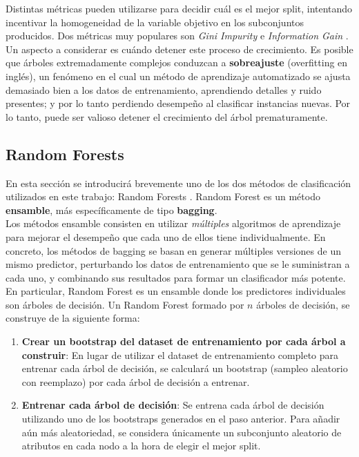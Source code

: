 Distintas métricas pueden utilizarse para decidir cuál es el mejor split, intentando incentivar la homogeneidad de la variable objetivo en los subconjuntos producidos. Dos métricas muy populares son \textit{Gini Impurity} e \textit{Information Gain} \cite{ginigain}.\\

Un aspecto a considerar es cuándo detener este proceso de crecimiento. Es posible que árboles extremadamente complejos conduzcan a \textbf{sobreajuste} (overfitting en inglés), un fenómeno en el cual un método de aprendizaje automatizado se ajusta demasiado bien a los datos de entrenamiento, aprendiendo detalles y ruido presentes; y por lo tanto perdiendo desempeño al clasificar instancias nuevas. Por lo tanto, puede ser valioso detener el crecimiento del árbol prematuramente.%

\subsection{Random Forests}

En esta sección se introducirá brevemente uno de los dos métodos de clasificación utilizados en este trabajo: Random Forests \cite{rf}. Random Forest es un método \textbf{ensamble}, más específicamente de tipo \textbf{bagging}. \\

Los métodos ensamble consisten en utilizar \textit{múltiples} algoritmos de aprendizaje para mejorar el desempeño que cada uno de ellos tiene individualmente. En concreto, los métodos de bagging \cite{bagging} se basan en generar múltiples versiones de un mismo predictor, perturbando los datos de entrenamiento que se le suministran a cada uno, y combinando sus resultados para formar un clasificador más potente. \\

En particular, Random Forest es un ensamble donde los predictores individuales son árboles de decisión. Un Random Forest formado por $n$ árboles de decisión, se construye de la siguiente forma:

\begin{enumerate}
\item \textbf{Crear un bootstrap del dataset de entrenamiento por cada árbol a construir}: En lugar de utilizar el dataset de entrenamiento completo para entrenar cada árbol de decisión, se calculará un bootstrap (sampleo aleatorio con reemplazo) por cada árbol de decisión a entrenar. 
\item \textbf{Entrenar cada árbol de decisión}: Se entrena cada árbol de decisión utilizando uno de los bootstraps generados en el paso anterior. Para añadir aún más aleatoriedad, se considera únicamente un subconjunto aleatorio de atributos en cada nodo a la hora de elegir el mejor split.
\end{enumerate}

